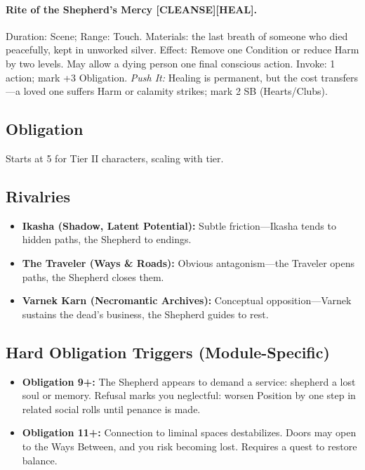 \documentclass[11pt]{article}
\begin{document}
\paragraph{Rite of the Shepherd's Mercy [CLEANSE][HEAL].} Duration: Scene; Range: Touch.  
Materials: the last breath of someone who died peacefully, kept in unworked silver.  
Effect: Remove one Condition or reduce Harm by two levels. May allow a dying person one final conscious action.  
Invoke: 1 action; mark +3 Obligation.  
\emph{Push It:} Healing is permanent, but the cost transfers---a loved one suffers Harm or calamity strikes; mark 2 SB (Hearts/Clubs).

\subsection*{Obligation}
Starts at 5 for Tier II characters, scaling with tier.

\subsection*{Rivalries}
\begin{itemize}
  \item \textbf{Ikasha (Shadow, Latent Potential):} Subtle friction---Ikasha tends to hidden paths, the Shepherd to endings.
  \item \textbf{The Traveler (Ways \& Roads):} Obvious antagonism---the Traveler opens paths, the Shepherd closes them.
  \item \textbf{Varnek Karn (Necromantic Archives):} Conceptual opposition---Varnek sustains the dead's business, the Shepherd guides to rest.
\end{itemize}

\subsection*{Hard Obligation Triggers (Module-Specific)}
\begin{itemize}
  \item \textbf{Obligation 9+:} The Shepherd appears to demand a service: shepherd a lost soul or memory. Refusal marks you neglectful: worsen Position by one step in related social rolls until penance is made.
  \item \textbf{Obligation 11+:} Connection to liminal spaces destabilizes. Doors may open to the Ways Between, and you risk becoming lost. Requires a quest to restore balance.
\end{itemize}
\end{document}
